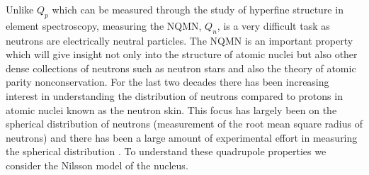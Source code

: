 \documentclass[10pt,a4paper, twoside, openright]{report}
\begin{document}
Unlike $Q_p$ which can be measured through the study of hyperfine structure in element spectroscopy, measuring the NQMN, $Q_{n}$,  is a very difficult  task as neutrons are electrically neutral particles. The NQMN is an important property which will give insight not only into the structure of  atomic nuclei but also other dense collections of neutrons such as neutron stars \cite{Brown2000, Furnstahl2002, Typel2001, Reinhard2010} and also the theory of atomic parity nonconservation. For the last two decades there has been increasing interest in understanding the distribution of neutrons compared to protons in atomic nuclei known as the neutron skin. This focus has largely been on the spherical distribution of neutrons (measurement of the root mean square radius of neutrons) and there has been a large amount of experimental effort in measuring the spherical distribution \cite{Clark2003, Trzcinska2001, Lenske2009, Abrahamyan2012}. To understand these quadrupole properties we consider the Nilsson model of the nucleus.
\end{document}
